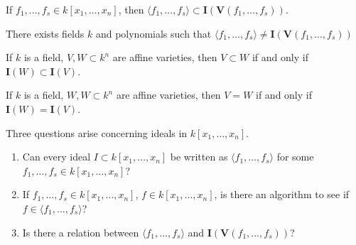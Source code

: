\documentclass[crop=false,class=book]{standalone}
\begin{document}
\begin{theorem}
If $f_1,\hdots, f_s \in k[x_1,\hdots ,x_n]$, then $\langle f_1,\hdots, f_s \rangle \subset \mathbf{I}(\mathbf{V}(f_1,\hdots, f_s))$.
\end{theorem}
\begin{theorem}
There exists fields $k$ and polynomials such that $\langle f_1,\hdots,f_s\rangle \ne \mathbf{I}(\mathbf{V}(f_1,\hdots, f_s))$
\end{theorem}
\begin{theorem}
If $k$ is a field, $V,W\subset k^n$ are affine varieties, then $V\subset W$ if and only if $\mathbf{I}(W)\subset \mathbf{I}(V)$.
\end{theorem}
\begin{theorem}
If $k$ is a field, $W,W\subset k^n$ are affine varieties, then $V=W$ if and only if $\mathbf{I}(W)=\mathbf{I}(V)$.
\end{theorem}
Three questions arise concerning ideals in $k[x_1,\hdots ,x_n]$.
\begin{enumerate}
    \item Can every ideal $I\subset k[x_1,\hdots ,x_n]$ be written as $\langle f_1,\hdots, f_s\rangle$ for some $f_1,\hdots, f_s \in k[x_1,\hdots ,x_n]$?
    \item If $f_1,\hdots, f_s\in k[x_1,\hdots ,x_n]$, $f\in k[x_1,\hdots ,x_n]$, is there an algorithm to see if $f\in\langle f_{1},\hdots,f_{s}\rangle$?
    \item Is there a relation between $\langle f_1,\hdots, f_s\rangle$ and $\mathbf{I}(\mathbf{V}(f_1,\hdots, f_s))$?
\end{enumerate}
\end{document}
